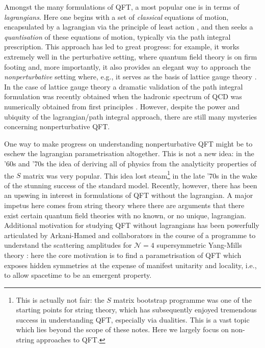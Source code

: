 \documentclass[11pt]{amsart}
\theoremstyle{plain}%
\theoremstyle{definition}
\theoremstyle{remark}
\begin{document}
Amongst the many formulations of QFT, a most popular one is in terms of \emph{lagrangians}. Here one begins with a set of \emph{classical} equations of motion, encapsulated by a lagrangian via the principle of least action \cite{arnold_mathematical_1989}, and then seeks a \emph{quantisation} of these equations of motion, typically via the path integral prescription. This approach has led to great progress: for example, it works extremely well in the perturbative setting, where quantum field theory is on firm footing and, more importantly, it also provides an elegant way to approach the \emph{nonperturbative} setting where, e.g., it serves as the basis of lattice gauge theory \cite{creutz_quarks_1985,wilson_confinement_1974}. In the case of lattice gauge theory a dramatic validation of the path integral formulation was recently obtained when the hadronic spectrum of QCD was numerically obtained from first principles \cite{durr_ab_2008}. However, despite the power and ubiquity of the lagrangian/path integral approach, there are still many mysteries concerning nonperturbative QFT.  

One way to make progress on understanding nonperturbative QFT might be to eschew the lagrangian parametrisation altogether. This is not a new idea: in the '60s and '70s the idea of deriving all of physics from the analyticity properties \cite{eden_analytic_2002} of the $S$ matrix was very popular. This idea lost steam\footnote{This is actually not fair: the $S$ matrix bootstrap programme was one of the starting points for string theory, which has subsequently enjoyed tremendous success in understanding QFT, especially via dualities. This is a vast topic which lies beyond the scope of these notes. Here we largely focus on non-string approaches to QFT.} in the late '70s in the wake of the stunning success of the standard model. Recently, however, there has been an upswing in interest in formulations of QFT without the lagrangian. A major impetus here comes from string theory \cite{moore_physical_2014,howard_georgi_particles_2012} where there are arguments that there exist certain quantum field theories \cite{witten_comments_1995,moore_lecture_2012} with no known, or no unique, lagrangian. Additional motivation for studying QFT without lagrangians has been powerfully articulated by Arkani-Hamed and collaborators in the course of a programme to understand the scattering amplitudes for $\mathcal{N}=4$ supersymmetric Yang-Mills theory \cite{arkani-hamed_what_2010,arkani-hamed_into_2014,arkani-hamed_tree_2008,arkani-hamed_scattering_2012,arkani-hamed_all-loop_2011,arkani-hamed_amplituhedron_2014,arkani-hamed_s-matrix_2010,arkani-hamed_what_2010}: here the core motivation is to find a parametrisation of QFT which exposes hidden symmetries at the expense of  manifest unitarity and locality, i.e., to allow spacetime to be an emergent property.  
\end{document}
